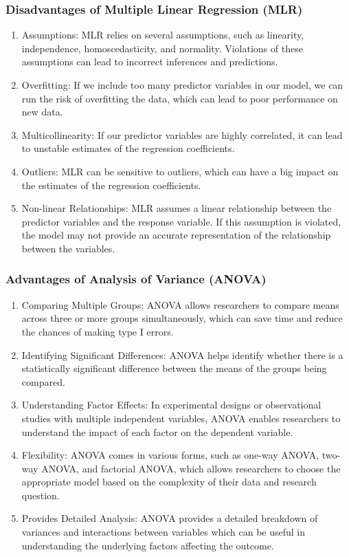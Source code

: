 \documentclass[a4paper]{article}
\begin{document}
	\subsubsection{Disadvantages of Multiple Linear Regression (MLR)}
	\begin{enumerate}
		\item Assumptions: MLR relies on several assumptions, such as linearity, independence, homoscedasticity, and normality. Violations of these assumptions can lead to incorrect inferences and predictions.
		
		\item Overfitting: If we include too many predictor variables in our model, we can run the risk of overfitting the data, which can lead to poor performance on new data.
		
		\item Multicollinearity: If our predictor variables are highly correlated, it can lead to unstable estimates of the regression coefficients.
		
		\item Outliers: MLR can be sensitive to outliers, which can have a big impact on the estimates of the regression coefficients.
		
		\item Non-linear Relationships: MLR assumes a linear relationship between the predictor variables and the response variable. If this assumption is violated, the model may not provide an accurate representation of the relationship between the variables.
	\end{enumerate}
	\subsubsection{Advantages of Analysis of Variance (ANOVA)}
	\begin{enumerate}
		\item Comparing Multiple Groups: ANOVA allows researchers to compare means across three or more groups simultaneously, which can save time and reduce the chances of making type I errors.
		
		\item Identifying Significant Differences: ANOVA helps identify whether there is a statistically significant difference between the means of the groups being compared.
		
		\item Understanding Factor Effects: In experimental designs or observational studies with multiple independent variables, ANOVA enables researchers to understand the impact of each factor on the dependent variable.
		
		\item Flexibility: ANOVA comes in various forms, such as one-way ANOVA, two-way ANOVA, and factorial ANOVA, which allows researchers to choose the appropriate model based on the complexity of their data and research question.
		
		\item Provides Detailed Analysis: ANOVA provides a detailed breakdown of variances and interactions between variables which can be useful in understanding the underlying factors affecting the outcome.
	\end{enumerate}
\end{document}
